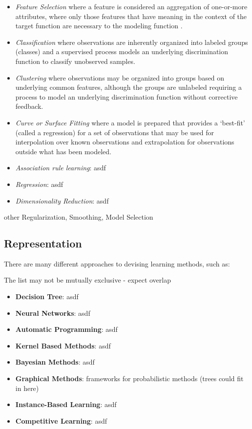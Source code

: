 \documentclass[a4paper, 11pt]{article}
\begin{document}
\begin{itemize}
	\item \emph{Feature Selection} where a feature is considered an aggregation of one-or-more attributes, where only those features that have meaning in the context of the target function are necessary to the modeling function \cite{Kudo2000, Guyon2003}.
	\item \emph{Classification} where observations are inherently organized into labeled groups (classes) and a supervised process models an underlying discrimination function to classify unobserved samples.
	\item \emph{Clustering} where observations may be organized into groups based on underlying common features, although the groups are unlabeled requiring a process to model an underlying discrimination function without corrective feedback.
	\item \emph{Curve or Surface Fitting} where a model is prepared that provides a `best-fit' (called a regression) for a set of observations that may be used for interpolation over known observations and extrapolation for observations outside what has been modeled.
	
	\item \emph{Association rule learning}: asdf
	\item \emph{Regression}: asdf
	\item \emph{Dimensionality Reduction}: asdf
	
\end{itemize}

other
Regularization, Smoothing, Model Selection



\subsection{Representation}
\label{subsec:representation}
There are many different approaches to devising learning methods, such as:

The list may not be mutually exclusive - expect overlap

\begin{itemize}
	\item \textbf{Decision Tree}: asdf
	\item \textbf{Neural Networks}: asdf
	\item \textbf{Automatic Programming}: asdf
	\item \textbf{Kernel Based Methods}: asdf
	\item \textbf{Bayesian Methods}: asdf
	\item \textbf{Graphical Methods}: frameworks for probabilistic methods (trees could fit in here)
	
	\item \textbf{Instance-Based Learning}: asdf
	\item \textbf{Competitive Learning}: asdf
	
\end{itemize}
\end{document}
